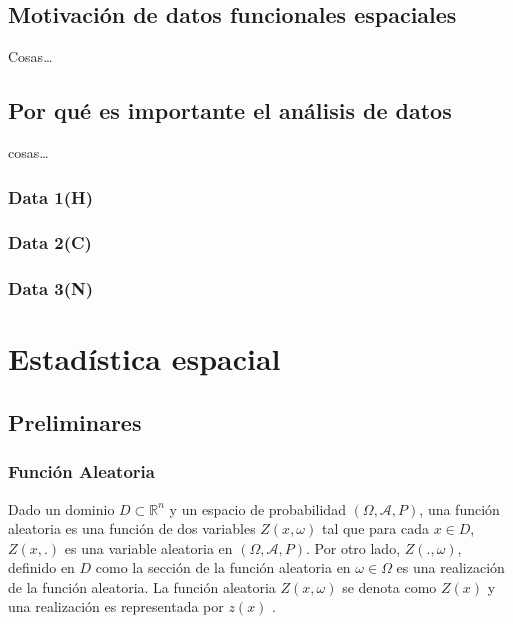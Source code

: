 \documentclass[
]{book}
\begin{document}
\hypertarget{motivaciuxf3n-de-datos-funcionales-espaciales}{%
\section{Motivación de datos funcionales espaciales}\label{motivaciuxf3n-de-datos-funcionales-espaciales}}

Cosas\ldots{}

\hypertarget{por-quuxe9-es-importante-el-anuxe1lisis-de-datos}{%
\section{Por qué es importante el análisis de datos}\label{por-quuxe9-es-importante-el-anuxe1lisis-de-datos}}

cosas\ldots{}

\hypertarget{data-1h}{%
\subsection{Data 1(H)}\label{data-1h}}

\hypertarget{data-2c}{%
\subsection{Data 2(C)}\label{data-2c}}

\hypertarget{data-3n}{%
\subsection{Data 3(N)}\label{data-3n}}

\hypertarget{estaduxedstica-espacial}{%
\chapter{Estadística espacial}\label{estaduxedstica-espacial}}

\hypertarget{preliminares}{%
\section{Preliminares}\label{preliminares}}

\hypertarget{funciuxf3n-aleatoria}{%
\subsection{Función Aleatoria}\label{funciuxf3n-aleatoria}}

Dado un dominio \(D\subset \mathbb{R}^n\) y un espacio de probabilidad \((\Omega,\mathcal{A},P)\), una función aleatoria es una función de dos variables \(Z(x,\omega)\) tal que para cada \(x\in D\), \(Z(x,.)\) es una variable aleatoria en \((\Omega,\mathcal{A},P)\). Por otro lado, \(Z(.,\omega)\), definido en \(D\) como la sección de la función aleatoria en \(\omega \in \Omega\) es una realización de la función aleatoria. La función aleatoria \(Z(x,\omega)\) se denota como \(Z(x)\) y una realización es representada por \(z(x)\) \citep{GeoJean}.
\end{document}
